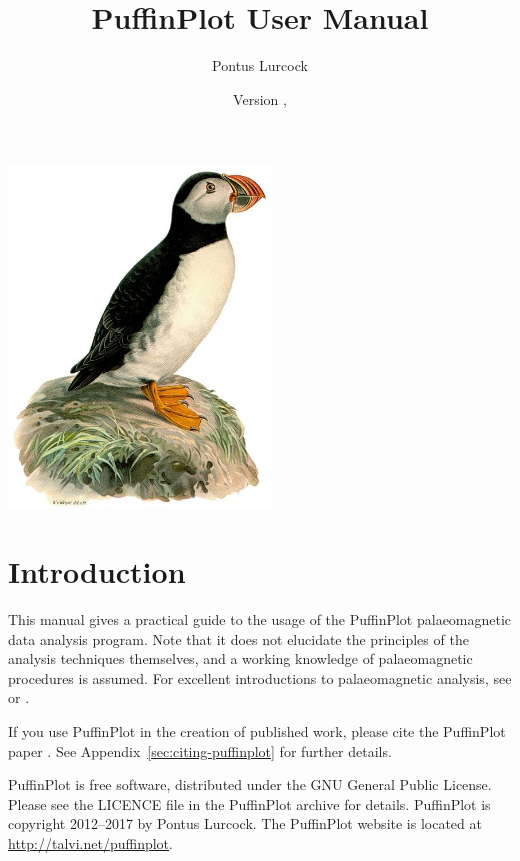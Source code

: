 \documentclass[a4paper,british]{article}
\title{PuffinPlot User Manual}
\author{Pontus Lurcock}
\date{Version \VcsVersion, \VcsDate}
\newcommand{\ppcmd}[1]{\textsf{#1}} %
\begin{document}
\maketitle
\ifpdf
\vspace{5cm}
\fi
\begin{center}
\includegraphics[width=70mm]{figures/Fratercula_arctica.jpeg}
\end{center}

\tableofcontents

\clearpage

\section{Introduction}

This manual gives a practical guide to the usage of the PuffinPlot
palaeomagnetic data analysis program. Note that it does not elucidate the
principles of the analysis techniques themselves, and a working knowledge of
palaeomagnetic procedures is assumed. For excellent introductions to
palaeomagnetic analysis, see \cite{tauxe2010paleomagnetism} or
\cite{butler1992paleomagnetism}.

If you use PuffinPlot in the creation of published work, please cite the
PuffinPlot paper \citep{lurcock2012puffinplot}. See
Appendix~\ref{sec:citing-puffinplot} for further details.

PuffinPlot is free software, distributed under the GNU General Public
License. Please see the \ppcmd{LICENCE} file in the PuffinPlot archive
for details. PuffinPlot is copyright 2012--2017 by Pontus Lurcock. The
PuffinPlot website is located at \url{http://talvi.net/puffinplot}.
\end{document}
